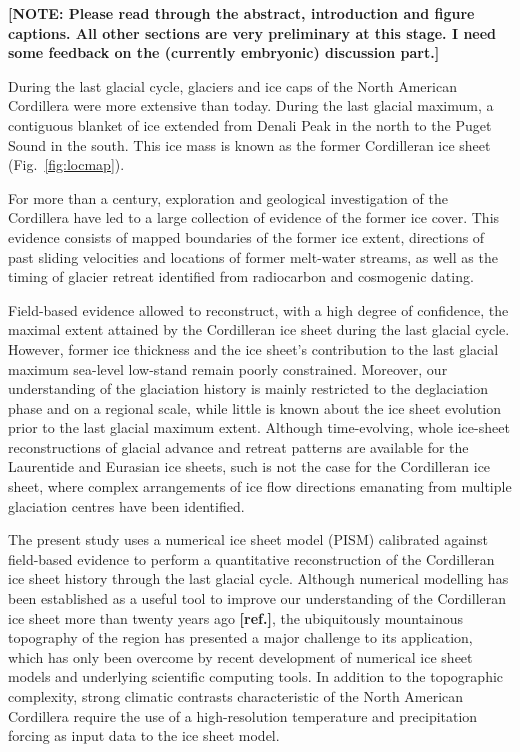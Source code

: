 \documentclass[tc, ms]{copernicus}
\newcommand{\note}[1]{\textbf{[NOTE: #1]}}
\newcommand{\aref}[0]{\textbf{[ref.]}}
\begin{document}
\note{Please read through the abstract, introduction and figure captions. All
      other sections are very preliminary at this stage. I need some feedback
      on the (currently embryonic) discussion part.}

\introduction
\label{sec:intro}

During the last glacial cycle, glaciers and ice caps of the North American
Cordillera were more extensive than today. During the last glacial maximum, a
contiguous blanket of ice extended from Denali Peak in the north to the Puget
Sound in the south. This ice mass is known as the former Cordilleran ice
sheet (Fig.~\ref{fig:locmap}).

For more than a century, exploration and geological investigation of the
Cordillera have led to a large collection of evidence of the former ice cover. This
evidence consists of mapped boundaries of the former ice extent, directions of
past sliding velocities and locations of former melt-water streams, as well as
the timing of glacier retreat identified from radiocarbon and cosmogenic dating.

Field-based evidence allowed to reconstruct, with a high degree of confidence,
the maximal extent attained by the Cordilleran ice sheet during the last glacial
cycle. However, former ice thickness and the ice sheet's contribution to the
last glacial maximum sea-level low-stand remain poorly constrained. Moreover,
our understanding of the glaciation history is mainly restricted to the
deglaciation phase and on a regional scale, while little is known about the ice
sheet evolution prior to the last glacial maximum extent. Although
time-evolving, whole ice-sheet reconstructions of glacial advance and retreat
patterns are available for the Laurentide and Eurasian ice sheets, such is not
the case for the Cordilleran ice sheet, where complex arrangements of ice flow
directions emanating from multiple glaciation centres have been identified.

The present study uses a numerical ice sheet model (PISM) calibrated against
field-based evidence to perform a quantitative reconstruction of the
Cordilleran ice sheet history through the last glacial cycle. Although
numerical modelling has been established as a useful tool to improve our
understanding
of the Cordilleran ice sheet more than twenty years ago \aref, the ubiquitously
mountainous topography of the region has presented a major challenge to its
application, which has only been overcome by recent development of numerical ice
sheet models and underlying scientific computing tools. In addition to the topographic
complexity, strong climatic contrasts characteristic of the North American
Cordillera require the use of a high-resolution temperature and precipitation
forcing as input data to the ice sheet model.
\end{document}

